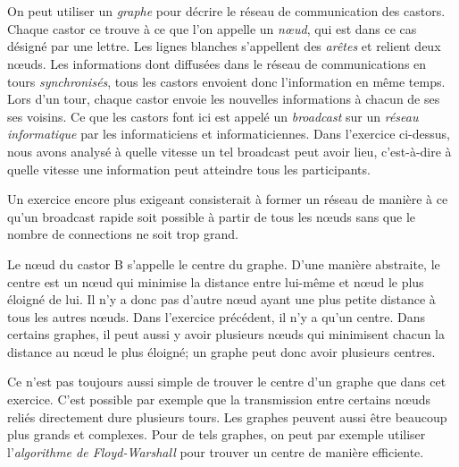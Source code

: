 {{%
\section*{\BrochureItsInformatics}
On peut utiliser un \emph{graphe} pour décrire le réseau de communication des castors. Chaque castor ce trouve à ce que l’on appelle un \emph{nœud}, qui est dans ce cas désigné par une lettre. Les lignes blanches s’appellent des \emph{arêtes} et relient deux nœuds. Les informations dont diffusées dans le réseau de communications en tours \emph{synchronisés}, tous les castors envoient donc l’information en même temps. Lors d’un tour, chaque castor envoie les nouvelles informations à chacun de ses ses voisins. Ce que les castors font ici est appelé un \emph{broadcast} sur un \emph{réseau informatique} par les informaticiens et informaticiennes. Dans l’exercice ci-dessus, nous avons analysé à quelle vitesse un tel broadcast peut avoir lieu, c’est-à-dire à quelle vitesse une information peut atteindre tous les participants.

Un exercice encore plus exigeant consisterait à former un réseau de manière à ce qu’un broadcast rapide soit possible à partir de tous les nœuds sans que le nombre de connections ne soit trop grand.

Le nœud du castor B s’appelle le centre du graphe. D’une manière abstraite, le centre est un nœud qui minimise la distance entre lui-même et nœud le plus éloigné de lui. Il n’y a donc pas d’autre nœud ayant une plus petite distance à tous les autres nœuds. Dans l’exercice précédent, il n’y a qu’un centre. Dans certains graphes, il peut aussi y avoir plusieurs nœuds qui minimisent chacun la distance au nœud le plus éloigné; un graphe peut donc avoir plusieurs centres.

Ce n’est pas toujours aussi simple de trouver le centre d’un graphe que dans cet exercice. C’est possible par exemple que la transmission entre certains nœuds reliés directement dure plusieurs tours. Les graphes peuvent aussi être beaucoup plus grands et complexes. Pour de tels graphes, on peut par exemple utiliser l’\emph{algorithme de Floyd-Warshall} pour trouver un centre de manière efficiente.



}}
